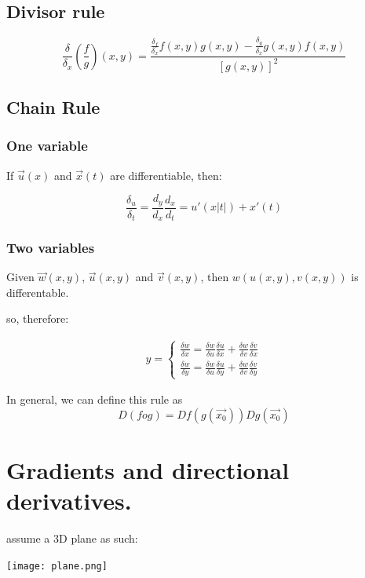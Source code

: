 \documentclass[11pt,fleqn]{book} %
\begin{document}
\subsection{Divisor rule}
$$\frac{\delta}{\delta_x}(\frac{f}{g})(x,y) = \frac{\frac{\delta_f}{\delta_x} f(x,y) g(x,y) - \frac{\delta_g}{\delta_x} g(x,y) f(x,y)}{[g(x,y)]^2}$$
\subsection{Chain Rule}

\subsubsection{One variable}
If $\vec{u}(x)$ and $\vec{x}(t)$ are differentiable, then: 

$$\frac{\delta_u}{\delta_t} = \frac{d_y}{d_x} \frac{d_x}{d_t} = u'(x|t|) + x'(t)$$

\subsubsection{Two variables}

Given  $\vec{w}(x,y)$, $\vec{u}(x,y)$ and $\vec{v}(x,y)$, then $w(u(x,y), v(x,y))$ is differentable.

so, therefore:

\begin{gather}
    y = 
    \begin{cases}
        \frac{\delta w}{\delta x} = \frac{\delta w}{\delta u} \frac{\delta u}{\delta x} + \frac{\delta w}{\delta v} \frac{\delta v}{\delta x} \\
        \frac{\delta w}{\delta y} = \frac{\delta w}{\delta u} \frac{\delta u}{\delta y} + \frac{\delta w}{\delta v} \frac{\delta v}{\delta y} 
    \end{cases}
\end{gather}


In general, we can define this rule as 
\begin{equation}
    D(f o g) = Df(g(\vec{x_0})) Dg(\vec{x_0})
\end{equation}

\section{Gradients and directional derivatives.}

assume a 3D plane as such:

\begin{center}
    \texttt{[image: plane.png]}
\end{center}
\end{document}
